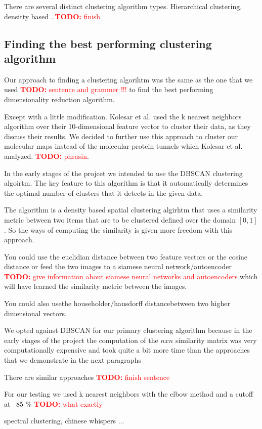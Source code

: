 \documentclass[journal]{vgtc}       %
\newcommand{\todo}[1]{\textcolor{red}{\textbf{TODO:} #1}}
\begin{document}
There are several distinct clustering algorithm types. Hierarchical clustering, densitty based ..\todo{finish}


\subsection{Finding the best performing clustering algorithm}
Our approach to finding a clustering algorihtm was the same as the one that we used \todo{sentence and grammer  !!! } to find the best performing dimensionality reduction algorithm.

Except with a little modification. Kolesar et al. \cite{kolesar} used the k nearest neighbors algorithm over their 10-dimensional feature vector to cluster their data, as they discuss their results. We decided to further use this approach to cluster our molecular maps instead of the molecular protein tunnels which Kolesar et al. analyzed. \todo{phrasin}.


In the early stages of the projcet we intended to use the DBSCAN clustering algoirtm. 
The key feature to this algorithm is that it automatically determines the optimal number of clusters that it detects in the given data. 

The algorithm is a density based spatial clustering algirhtm that uses a similarity metric between two items that are to be  clustered defined over the domain \([0,1]\). So the ways of computing the similarity is given more freedom with this approach.


You could use the euclidian distance between two feature vectors or the cosine distance or feed the two images to a siamese neural network/autoencoder \todo{give information about siamese neural networks and autoencoders} which will have learned the similarity metric between the images.

You could also usethe householder/hausdorff distancebetween two higher dimensional vectors.

We opted against DBSCAN for our primary clustering algorithm because in the early stages of the project the computation of the \(nxn\) similarity matrix was very computationally expensive and took quite a bit more time than the approaches that we demonstrate in the next paragraphs

There are similar approaches \todo{finish sentence}

For our testing we used k nearest neighbors with the elbow method and a cutoff at  ~85 \% \todo{what exactly}

spectral clustering, chinese whispers  ... 
\end{document}
